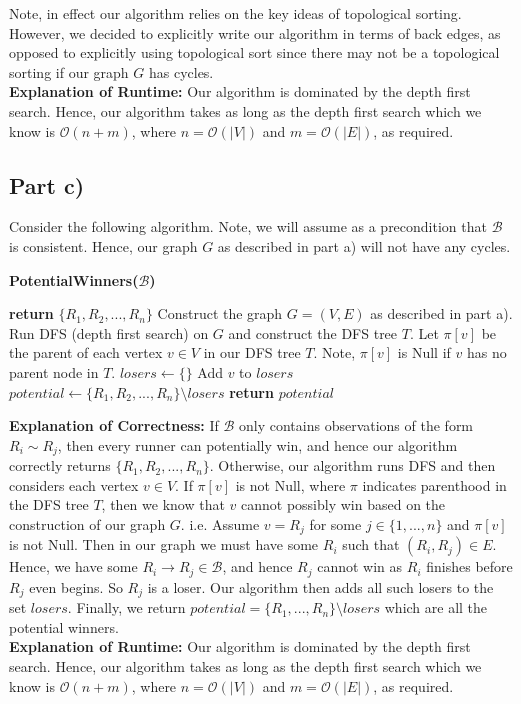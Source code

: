 \documentclass[12pt]{article}
\begin{document}
Note, in effect our algorithm relies on the key ideas of topological sorting. However, we decided to explicitly write our algorithm in terms of back edges, as opposed to explicitly using topological sort since there may not be a topological sorting if our graph $G$ has cycles. \\

\textbf{Explanation of Runtime:} Our algorithm is dominated by the depth first search. Hence, our algorithm takes as long as the depth first search which we know is $\mathcal{O}(n+m)$, where $n = \mathcal{O}(|V|)$ and $m = \mathcal{O}(|E|)$, as required. 

\subsection*{Part c)}

Consider the following algorithm. Note, we will assume as a precondition that $\mathcal{B}$ is consistent. Hence, our graph $G$ as described in part a) will not have any cycles. 

\begin{algorithm}[hbt!]
\caption{\textbf{PotentialWinners($\mathcal{B}$)}}\label{alg:cap}

\begin{algorithmic}[1]
    \State \textbf{return} $\{R_1,R_2,...,R_n\}$
\EndIf
\State Construct the graph $G = (V,E)$ as described in part a). 
\State Run DFS (depth first search) on $G$ and construct the DFS tree $T$.
\State Let $\pi[v]$ be the parent of each vertex $v \in V$ in our DFS tree $T$. Note, $\pi[v]$ is Null if $v$ has no parent node in $T$. 
\State 
\State $losers \gets \{ \}$
        \State Add $v$ to $losers$
    \EndIf
\EndFor
\State
\State $potential \gets \{R_1,R_2,...,R_n\} \setminus losers$
\State \textbf{return} $potential$
\end{algorithmic}
\end{algorithm}

\textbf{Explanation of Correctness:} If $\mathcal{B}$ only contains observations of the form $R_i \sim R_j$, then every runner can potentially win, and hence our algorithm correctly returns $\{R_1,R_2,...,R_n\}$. Otherwise, our algorithm runs DFS and then considers each vertex $v \in V$. If $\pi[v]$ is not Null, where $\pi$ indicates parenthood in the DFS tree $T$, then we know that $v$ cannot possibly win based on the construction of our graph $G$. i.e. Assume $v = R_j$ for some $j \in \{1,...,n\}$ and $\pi[v]$ is not Null. Then in our graph we must have some $R_i$ such that $(R_i,R_j) \in E$. Hence, we have some $R_i \rightarrow R_j \in \mathcal{B}$, and hence $R_j$ cannot win as $R_i$ finishes before $R_j$ even begins. So $R_j$ is a loser. Our algorithm then adds all such losers to the set $losers$. Finally, we return $potential = \{R_1,...,R_n\} \setminus losers$ which are all the potential winners. \\

\textbf{Explanation of Runtime:} Our algorithm is dominated by the depth first search. Hence, our algorithm takes as long as the depth first search which we know is $\mathcal{O}(n+m)$, where $n = \mathcal{O}(|V|)$ and $m = \mathcal{O}(|E|)$, as required. 
\end{document}
